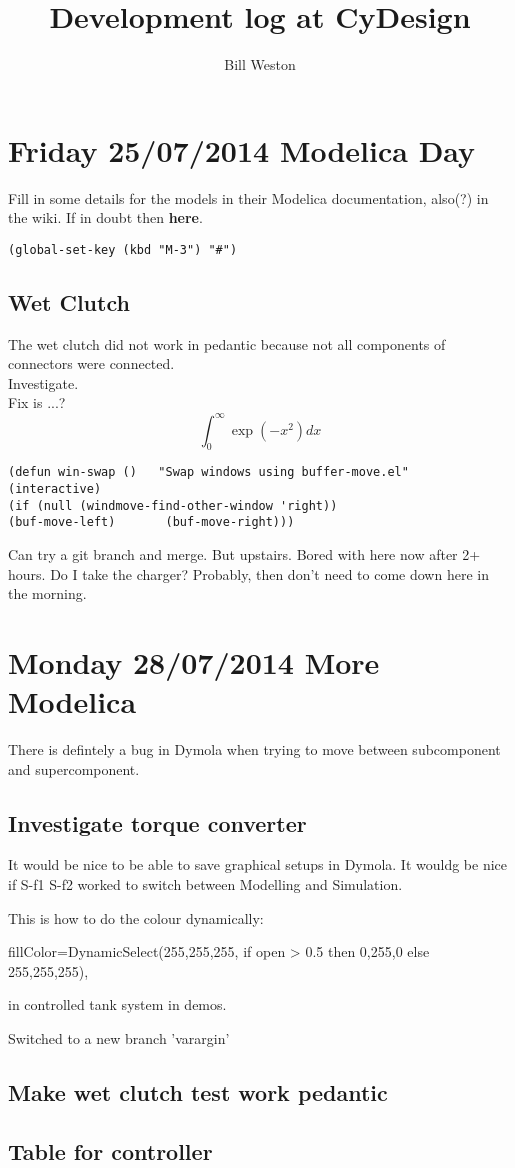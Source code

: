 \documentclass[11pt, oneside]{article}   	%
\title{Development log at CyDesign}
\author{Bill Weston}
\begin{document}
\maketitle
\section{Friday 25/07/2014  Modelica Day}

Fill in some details for the models in their Modelica documentation, also(?) in the wiki.
If in doubt then {\bf here}.

\verb+(global-set-key (kbd "M-3") "#")+
\subsection{Wet Clutch}
The wet clutch did not work in pedantic because not all components of connectors were connected.\\
Investigate.\\
Fix is ...?
$$ \int_0^{\infty}\exp(-x^2) dx $$

\begin{verbatim}
(defun win-swap ()   "Swap windows using buffer-move.el"   (interactive)     
(if (null (windmove-find-other-window 'right))         
(buf-move-left)       (buf-move-right)))
\end{verbatim}

Can try a git branch and merge.
But upstairs.  Bored with here now after 2+ hours.
Do I take the charger?  Probably, then don't need to come down here in the morning.

\section{Monday 28/07/2014  More Modelica}

There is defintely a bug in Dymola when trying to move between
subcomponent and supercomponent.

\subsection{Investigate torque converter}
It would be nice to be able to save graphical setups in Dymola.
It wouldg be nice if S-f1 S-f2 worked to switch between Modelling and Simulation.

This is how to do the colour dynamically:

       fillColor=DynamicSelect({255,255,255}, if open > 0.5 then {0,255,0} else 
                    {255,255,255}),

in controlled tank system in demos.



Switched to a new branch 'varargin'

\subsection{Make wet clutch test work pedantic}
\subsection{Table for controller}
\end{document}
